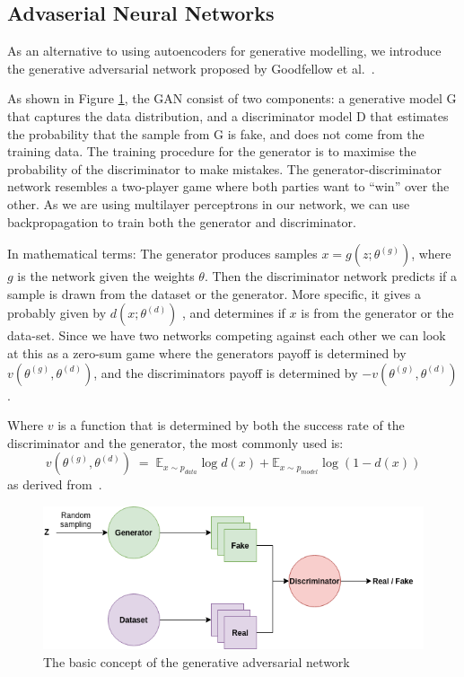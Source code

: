     
\subsection{Advaserial Neural Networks}
\label{cha:Explaining_GANS}
As an alternative to using autoencoders for generative modelling, we introduce the generative adversarial network proposed by Goodfellow et al.~\cite{Goodfellow:2014:GAN:2969033.2969125}.

As shown in Figure \ref{fig:GAN}, the GAN consist of two components: a generative model G that captures the data distribution, and a discriminator model D that estimates the probability that the sample from G is fake, and does not come from the training data. The training procedure for the generator is to maximise the probability of the discriminator to make mistakes.
The generator-discriminator network resembles a two-player game where both parties want to ``win'' over the other.
As we are using multilayer perceptrons in our network, we can use backpropagation to train both the generator and discriminator. 

In mathematical terms:
The generator produces samples $x=g(z;\theta^{(g)})$, where $g$ is the network given the weights $\theta$. Then the discriminator network predicts if a sample is drawn from the dataset or the generator.
More specific, it gives a probably given by $d(x;\theta^{(d)})$ , and determines if $x$ is from the generator or the data-set. 
Since we have two networks competing against each other we can look at this as a zero-sum game where the generators payoff is determined by $v(\theta^{(g)},\theta^{(d)})$, and the discriminators payoff is determined by $-v(\theta^{(g)},\theta^{(d)})$.

Where $v$ is a function that is determined by both the success rate of the discriminator and the generator, the most commonly used is:
\begin{equation} 
    v(\theta^{(g)},\theta^{(d)}) \; = \; \mathds{E}_{x\sim p_{data}}\log{d(x)} + \mathds{E}_{x\sim p_{model}}\log{(1 - d(x))} 
\end{equation}
as derived from~\cite{Goodfellow:2014:GAN:2969033.2969125}.


\begin{figure}[ht!]
    \centering
    \includegraphics[scale=0.6]{background/figures/GAN.png}
    \caption{The basic concept of the generative adversarial network}
    \label{fig:GAN}
\end{figure}


